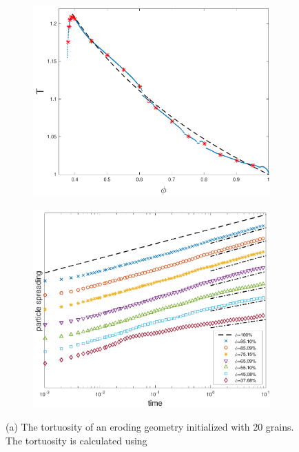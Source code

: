 \documentclass[preprint,10pt]{elsarticle}
\begin{document}
\begin{figure}[H]
\begin{subfigure}[b]{0.5\textwidth}
\includegraphics*[height = 0.8\linewidth]{./figs/tort_eulerian}
\caption{}
\end{subfigure}
\begin{subfigure}[b]{0.5\textwidth}
\includegraphics*[height = 0.8\linewidth]{./figs/20b_second_moment_long_ref}
\caption{}
\end{subfigure}
\caption{\label{fig:Eroding20Transport} (a) The tortuosity of an eroding
geometry initialized with 20 grains.  The tortuosity is calculated using
}
\end{figure}
\end{document}
